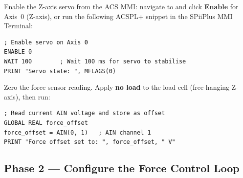 \begin{steplist}

  \step Enable the Z-axis servo from the ACS MMI:
        navigate to  and click \textbf{Enable} for
        Axis~0 (Z-axis), or run the following ACSPL+ snippet in the
        SPiiPlus MMI Terminal:

        \begin{acscode}
\begin{lstlisting}
; Enable servo on Axis 0
ENABLE 0
WAIT 100        ; Wait 100 ms for servo to stabilise
PRINT "Servo state: ", MFLAGS(0)
\end{lstlisting}
        \end{acscode}


  \step Zero the force sensor reading.
        Apply \textbf{no load} to the load cell (free-hanging Z-axis),
        then run:

        \begin{acscode}
\begin{lstlisting}
; Read current AIN voltage and store as offset
GLOBAL REAL force_offset
force_offset = AIN(0, 1)   ; AIN channel 1
PRINT "Force offset set to: ", force_offset, " V"
\end{lstlisting}
        \end{acscode}


\end{steplist}


\subsection{Phase 2 — Configure the Force Control Loop}
\label{sec:proc:phase2}

